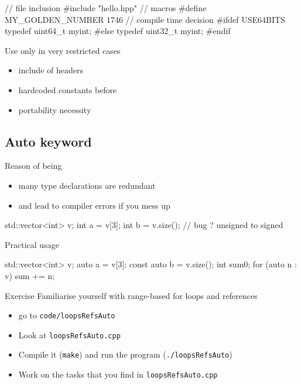 \begin{frame}[fragile]
  \begin{cppcode}
    // file inclusion
    #include "hello.hpp"
    // macros
    #define MY_GOLDEN_NUMBER 1746
    // compile time decision
    #ifdef USE64BITS
      typedef uint64_t myint;
    #else
      typedef uint32_t myint;
    #endif
  \end{cppcode}
  \pause
  \begin{block}{Use only in very restricted cases}
    \begin{itemize}
    \item include of headers
    \item hardcoded constants before 
    \item portability necessity
    \end{itemize}
  \end{block}
\end{frame}
\subsection[auto]{Auto keyword}

\begin{frame}[fragile]
  \begin{block}{Reason of being}
    \begin{itemize}
    \item many type declarations are redundant
    \item and lead to compiler errors if you mess up
    \end{itemize}
    \begin{cppcode*}{}
      std::vector<int> v;
      int a = v[3];
      int b = v.size();  // bug ? unsigned to signed
    \end{cppcode*}
  \end{block}
  \pause
  \begin{block}{Practical usage}
    \begin{cppcode*}{}
      std::vector<int> v;
      auto a = v[3];
      const auto b = v.size();
      int sum{0};
      for (auto n : v) { sum += n; }
    \end{cppcode*}
  \end{block}
\end{frame}

\begin{frame}[fragile]
  \begin{alertblock}{Exercise}
    Familiarise yourself with range-based for loops and references
    \begin{itemize}
      \item go to \texttt{code/loopsRefsAuto}
      \item Look at \texttt{loopsRefsAuto.cpp}
      \item Compile it (\texttt{make}) and run the program (\texttt{./loopsRefsAuto})
      \item Work on the tasks that you find in \texttt{loopsRefsAuto.cpp}
    \end{itemize}
  \end{alertblock}
\end{frame}
